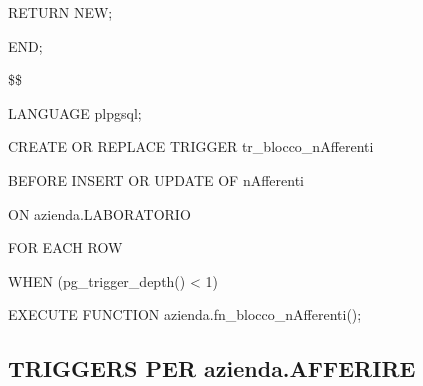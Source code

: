 \begin{flushleft}
\begin{description}
\begin{description}
                        \item RETURN NEW;
                    \end{description}
                    \item END;
                    \item \$\$
                    \item LANGUAGE plpgsql;
                \end{description}
            \end{flushleft}
        \normalfont

        \ttfamily
            \begin{flushleft}
                \begin{description}
                    \item CREATE OR REPLACE TRIGGER tr\_blocco\_nAfferenti
                    \item BEFORE INSERT OR UPDATE OF nAfferenti
                    \item ON azienda.LABORATORIO
                    \item FOR EACH ROW
                    \item WHEN (pg\_trigger\_depth() < 1)
                    \item EXECUTE FUNCTION azienda.fn\_blocco\_nAfferenti();
                \end{description}
            \end{flushleft}
        \normalfont

\newpage

    \subsection{TRIGGERS PER azienda.AFFERIRE}

